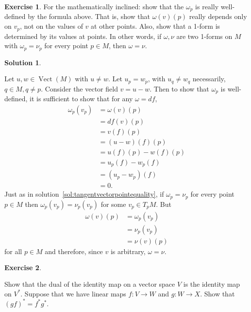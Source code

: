 \documentclass[11pt, a4paper]{report}
\theoremstyle{definition}
\newtheorem{exercise}{Exercise}[part]
\newtheorem{solution}{Solution}[part]
\newenvironment{ex}{\begin{exercise}}{\end{exercise}\pagebreak[1]}
\newenvironment{sol}{\begin{solution}}{\end{solution}\pagebreak[3]}
\DeclareMathOperator{\Vect}{Vect}
\begin{document}
\begin{ex}

For the mathematically inclined: show that the $\omega_p$ is really well-defined by the formula above.
That is, show that $\omega(v)(p)$ really depends only on $v_p$, not on the values of $v$ at other points.
Also, show that a 1-form is determined by its values at points.
In other words, if $\omega, \nu$ are two 1-forms on $M$ with $\omega_p = \nu_p$ for every point $p \in M$, then $\omega = \nu$.

\end{ex}

\begin{sol}\label{sol:welldefined1forms}

Let $u, w \in \Vect(M)$ with $u \neq w$. Let $u_p = w_p$, with $u_q \neq w_q$ necessarily, $q \in M, q \neq p$.
Consider the vector field $v = u - w$. Then to show that $\omega_p$ is well-defined, it is sufficient to show that for any $\omega = df$,
\begin{align*}
    \omega_p(v_p) &= \omega(v)(p) \\
                  &= df(v)(p) \\
                  &= v(f)(p) \\
                  &= (u - w)(f)(p) \\
                  &= u(f)(p) - w(f)(p) \\
                  &= u_p(f) - w_p(f) \\
                  &= (u_p - w_p)(f) \\
                  &= 0.
\end{align*}
Just as in solution~\ref{sol:tangentvectorpointequality}, if $\omega_p = \nu_p$ for every point $p \in M$ then $\omega_p(v_p) = \nu_p(v_p)$ for some $v_p \in T_p M$. But
\begin{align*}
\omega (v)(p) &= \omega_p(v_p) \\
              &= \nu_p(v_p) \\
              &= \nu (v)(p)
\end{align*}
for all $p \in M$ and therefore, since $v$ is arbitrary, $\omega = \nu$.

\end{sol}

\begin{ex}\label{ex:dualidentity}

Show that the dual of the identity map on a vector space $V$ is the identity map on $V^*$.
Suppose that we have linear maps $f: V \to W$ and $g: W \to X$. Show that ${(gf)}^* = f^* g^*$.

\end{ex}
\end{document}
